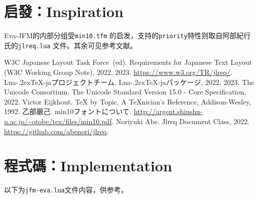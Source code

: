 \documentclass{ltjsarticle}
\def\LuaTeX{Lua\kern-.2ex\TeX}
\begin{document}
\section{启發：Inspiration}
\textsf{Eva-JFM}的内部分组受\texttt{min10.tfm} \cite{min10}的启发，支持的\texttt{priority}特性则取自阿部紀行氏的\texttt{jlreq.lua} \cite{ltxjlreq}文件。其余可见参考文献。

\begin{thebibliography}{99}
     W3C Japanese Layout Task Force~(ed). \newblock Requirements for Japanese Text Layout (W3C Working Group Note), 2022, 2023. \newblock \url{https://www.w3.org/TR/jlreq/}.
     \LuaTeX-jaプロジェクトチーム. \newblock \LuaTeX-jaパッケージ, 2022, 2023.
     The Unicode Consortium. \newblock The Unicode Standard Version 15.0 - Core Specification, 2022.
     Victor Eijkhout. \newblock \TeX{} by Topic, A \TeX nician's Reference, Addison-Wesley, 1992.
     乙部厳己. \newblock min10フォントについて. \newblock \url{http://argent.shinshu-u.ac.jp/~otobe/tex/files/min10.pdf}.
     Noriyuki Abe. \newblock Jlreq Document Class, 2022. \newblock \url{https://github.com/abenori/jlreq}.
\end{thebibliography}

\section*{程式碼：Implementation}\label{sec:impl}
以下为\texttt{jfm-eva.lua}文件内容，供参考。%

\end{document}
